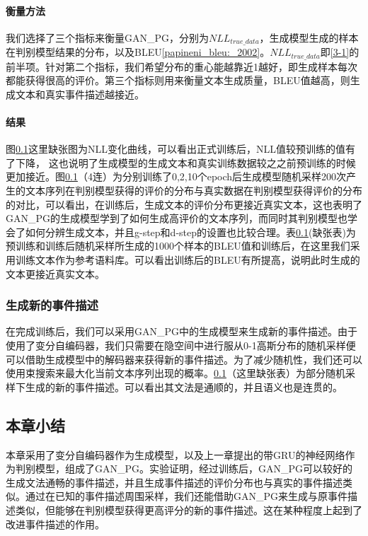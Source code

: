 \documentclass[]{template}
\begin{document}
\paragraph{衡量方法}
我们选择了三个指标来衡量GAN\_PG，分别为$NLL_{true\_data}$，生成模型生成的样本在判别模型结果的分布，以及BLEU\ref{papineni_bleu:_2002}。$NLL_{true\_data}$即\ref{3-1}的前半项。针对第二个指标，我们希望分布的重心能越靠近1越好，即生成样本每次都能获得很高的评价。第三个指标则用来衡量文本生成质量，BLEU值越高，则生成文本和真实事件描述越接近。
\paragraph{结果}
图\ref{}这里缺张图为NLL变化曲线，可以看出正式训练后，NLL值较预训练的值有了下降， 这也说明了生成模型的生成文本和真实训练数据较之之前预训练的时候更加接近。图\ref{}（4连）为分别训练了0,2,10个epoch后生成模型随机采样200次产生的文本序列在判别模型获得的评价的分布与真实数据在判别模型获得评价的分布的对比，可以看出，在训练后，生成文本的评价分布更接近真实文本，这也表明了GAN\_PG的生成模型学到了如何生成高评价的文本序列，而同时其判别模型也学会了如何分辨生成文本，并且g-step和d-step的设置也比较合理。表\ref{}(缺张表)为预训练和训练后随机采样所生成的1000个样本的BLEU值和训练后，在这里我们采用训练文本作为参考语料库。可以看出训练后的BLEU有所提高，说明此时生成的文本更接近真实文本。
\subsubsection{生成新的事件描述}
在完成训练后，我们可以采用GAN\_PG中的生成模型来生成新的事件描述。由于使用了变分自编码器，我们只需要在隐空间中进行服从0-1高斯分布的随机采样便可以借助生成模型中的解码器来获得新的事件描述。为了减少随机性，我们还可以使用束搜索来最大化当前文本序列出现的概率。\ref{}（这里缺张表）为部分随机采样下生成的新的事件描述。可以看出其文法是通顺的，并且语义也是连贯的。

\subsection{本章小结}
本章采用了变分自编码器作为生成模型，以及上一章提出的带GRU的神经网络作为判别模型，组成了GAN\_PG。实验证明，经过训练后，GAN\_PG可以较好的生成文法通畅的事件描述，并且生成事件描述的评价分布也与真实的事件描述类似。通过在已知的事件描述周围采样，我们还能借助GAN\_PG来生成与原事件描述类似，但能够在判别模型获得更高评分的新的事件描述。这在某种程度上起到了改进事件描述的作用。
\end{document}
